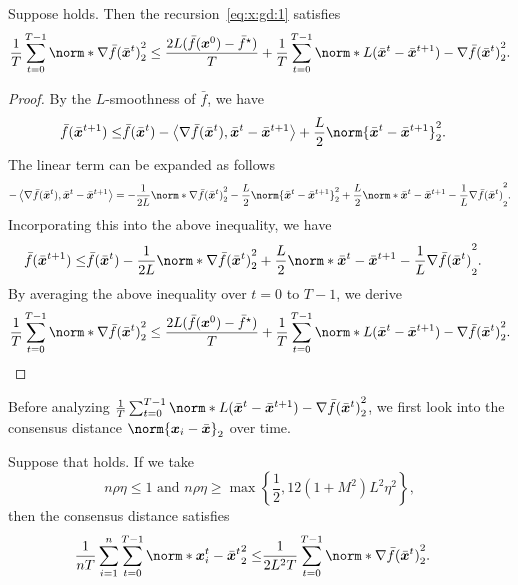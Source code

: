 \documentclass{article}
\begin{document}
\begin{lemma}\label{lemma:sd:1}
  Suppose  holds. Then the recursion~\eqref{eq:x:gd:1} satisfies
  \begin{align*}
    \frac{1}{T} \sum_{t=0}^{T-1} \norm*{\nabla \bar{f}(\bar{\xx}^{t})}_2^2
    \le \frac{2L(\bar{f}(\xx^{0}) - \bar{f}^\star)}{T}
    + \frac{1}{T} \sum_{t=0}^{T-1} \norm*{L(\bar{\xx}^{t}-\bar{\xx}^{t+1}) - \nabla \bar{f}(\bar{\xx}^{t})}_2^2.
  \end{align*}
\end{lemma}
\begin{proof}
  By the $L$-smoothness  of $\bar{f}$, we have
  \begin{align*}
    \bar{f}(\bar{\xx}^{t+1}) \le& \bar{f}(\bar{\xx}^{t}) - \left\langle\nabla \bar{f}(\bar{\xx}^{t}), \bar{\xx}^{t} - \bar{\xx}^{t+1} \right\rangle + \frac{L}{2} \norm{\bar{\xx}^{t}-\bar{\xx}^{t+1}}_2^2.
  \end{align*}
  The linear term can be expanded as follows
  \begin{align*}
    - \left\langle\nabla \bar{f}(\bar{\xx}^{t}), \bar{\xx}^{t} - \bar{\xx}^{t+1} \right\rangle 
    =- \frac{1}{2L} \norm*{\nabla \bar{f}(\bar{\xx}^{t})}_2^2 - \frac{L}{2} \norm{\bar{\xx}^{t}-\bar{\xx}^{t+1}}_2^2
    + \frac{L}{2} \norm*{\bar{\xx}^{t}-\bar{\xx}^{t+1} - \frac{1}{L}\nabla \bar{f}(\bar{\xx}^{t})}_2^2.
  \end{align*}
  Incorporating this into the above inequality, we have 
  \begin{align*}
    \bar{f}(\bar{\xx}^{t+1}) \le& \bar{f}(\bar{\xx}^{t}) - \frac{1}{2L} \norm*{\nabla \bar{f}(\bar{\xx}^{t})}_2^2
    + \frac{L}{2} \norm*{\bar{\xx}^{t}-\bar{\xx}^{t+1} - \frac{1}{L}\nabla \bar{f}(\bar{\xx}^{t})}_2^2.
  \end{align*}
  By averaging the above inequality over $t=0$ to $T-1$, we derive
  \begin{align*}
    \frac{1}{T} \sum_{t=0}^{T-1} \norm*{\nabla \bar{f}(\bar{\xx}^{t})}_2^2
    \le \frac{2L(\bar{f}(\xx^{0}) - \bar{f}^\star)}{T}
    + \frac{1}{T} \sum_{t=0}^{T-1} \norm*{L(\bar{\xx}^{t}-\bar{\xx}^{t+1}) - \nabla \bar{f}(\bar{\xx}^{t})}_2^2.
  \end{align*}
\end{proof}
Before analyzing $\frac{1}{T} \sum_{t=0}^{T-1} \norm*{L(\bar{\xx}^{t}-\bar{\xx}^{t+1}) - \nabla \bar{f}(\bar{\xx}^{t})}_2^2$, we first look into the consensus distance $\norm{\xx_i - \bar{\xx} }_2$ over time.
\begin{lemma}\label{lemma:consensus-distance:1}
  Suppose that  holds.
  If we take $$n\rho\eta\le 1 \text{ and } n\rho\eta\ge\max\left\{\frac{1}{2}, 12(1+M^2)L^2\eta^2\right\},$$
  then the consensus distance satisfies
  \begin{align*}
    \frac{1}{nT}\sum_{i=1}^n\sum_{t=0}^{T-1} \norm*{\xx_i^{t} - \bar{\xx}^{t}}_2^2
    \le& \frac{1}{2L^2T} \sum_{t=0}^{T-1} \norm*{\nabla \bar{f}(\bar{\xx}^t) }_2^2.
  \end{align*}
\end{lemma}
\end{document}
